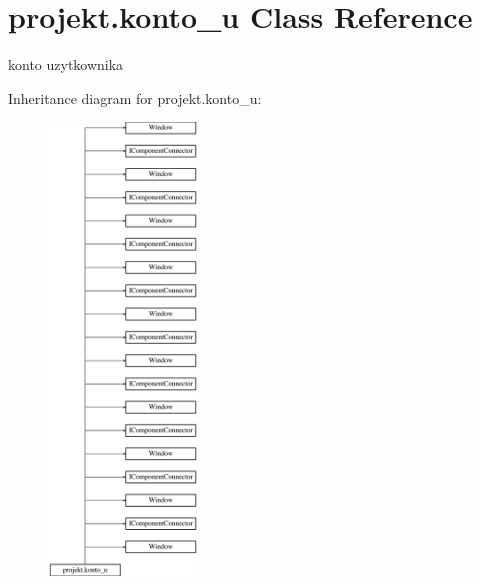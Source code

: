 \hypertarget{classprojekt_1_1konto__u}{}\section{projekt.\+konto\+\_\+u Class Reference}
\label{classprojekt_1_1konto__u}


konto uzytkownika  


Inheritance diagram for projekt.\+konto\+\_\+u\+:\begin{figure}[H]
\begin{center}
\leavevmode
\includegraphics[height=12.000000cm]{classprojekt_1_1konto__u}
\end{center}
\end{figure}
